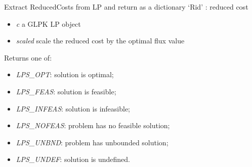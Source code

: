 \documentclass[a4paper,11pt,english]{sphinxmanual}
\begin{document}
\begin{fulllineitems}
\label{modules_doc:cbmpy.CBGLPK.glpk_getReducedCosts}
Extract ReducedCosts from LP and return as a dictionary `Rid' : reduced cost
\begin{itemize}
\item {} 
\emph{c} a GLPK LP object

\item {} 
\emph{scaled} scale the reduced cost by the optimal flux value

\end{itemize}

\end{fulllineitems}


\begin{fulllineitems}
\label{modules_doc:cbmpy.CBGLPK.glpk_getSolutionStatus}
Returns one of:
\begin{itemize}
\item {} 
\emph{LPS\_OPT}: solution is optimal;

\item {} 
\emph{LPS\_FEAS}: solution is feasible;

\item {} 
\emph{LPS\_INFEAS}: solution is infeasible;

\item {} 
\emph{LPS\_NOFEAS}: problem has no feasible solution;

\item {} 
\emph{LPS\_UNBND}: problem has unbounded solution;

\item {} 
\emph{LPS\_UNDEF}: solution is undefined.

\end{itemize}

\end{fulllineitems}

\end{document}
